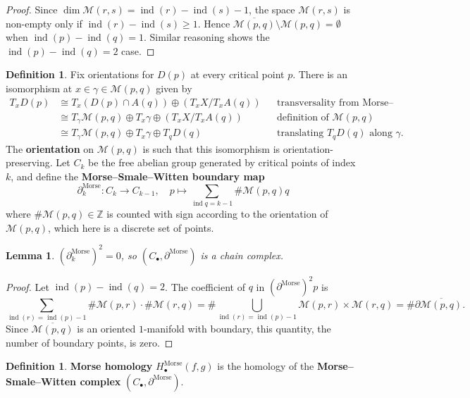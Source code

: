 \documentclass{report}
\theoremstyle{plain}
\newtheorem{lemma}[theorem]{Lemma}
\theoremstyle{definition}
\newtheorem{definition}[theorem]{Definition}
\theoremstyle{remark}
\newcommand{\di}{\partial}
\newcommand{\bZ}{\mathbb{Z}}
\newcommand{\cM}{\mathcal{M}}
\newcommand{\Morse}{\mathrm{Morse}}
\DeclareMathOperator{\ind}{ind}
\begin{document}
\begin{proof}
  Since $\dim \cM(r, s) = \ind(r) - \ind(s) - 1$, the space $\cM(r,
  s)$ is non-empty only if $\ind(r) - \ind(s) \ge 1$. Hence
  $\overline{\cM(p, q)}\setminus \cM(p, q) = \emptyset$ when $\ind(p)
  - \ind(q) = 1$. Similar reasoning shows the $\ind(p) - \ind(q) = 2$
  case.
\end{proof}

\begin{definition} \label{def:morse-theory-flow-line-orientation}
  Fix orientations for $D(p)$ at every critical point $p$. There is an
  isomorphism at $x \in \gamma \in \cM(p, q)$ given by
  \begin{align*}
    T_xD(p) &\cong T_x(D(p) \cap A(q)) \oplus (T_xX/T_xA(q)) && \text{transversality from Morse--Smale} \\
    &\cong T_\gamma \cM(p, q) \oplus T_x\gamma \oplus (T_xX/T_xA(q)) && \text{definition of $\cM(p, q)$} \\
    &\cong T_\gamma \cM(p, q) \oplus T_x\gamma \oplus T_qD(q) && \text{translating $T_qD(q)$ along $\gamma$.}
  \end{align*}
  The {\bf orientation} on $\cM(p, q)$ is such that this isomorphism
  is orientation-preserving. Let $C_k$ be the free abelian group
  generated by critical points of index $k$, and define the {\bf
    Morse--Smale--Witten boundary map}
  \[ \di_k^{\Morse}\colon C_k \to C_{k-1}, \quad p \mapsto \sum_{\ind q = k-1} \# \cM(p, q) q \]
  where $\# \cM(p, q) \in \bZ$ is counted with sign according to the
  orientation of $\cM(p, q)$, which here is a discrete set of points.
\end{definition}

\begin{lemma}
  $(\di_k^\Morse)^2 = 0$, so $(C_\bullet, \di^\Morse)$ is a chain
  complex.
\end{lemma}

\begin{proof}
  Let $\ind(p) - \ind(q) = 2$. The coefficient of $q$ in
  $(\di^\Morse)^2p$ is
  \[ \sum_{\ind(r) = \ind(p)-1} \# \cM(p, r) \cdot \# \cM(r, q) = \# \bigcup_{\ind(r) = \ind(p)-1} \cM(p, r) \times \cM(r, q) = \# \di \overline{\cM(p, q)}. \]
  Since $\overline{\cM(p, q)}$ is an oriented $1$-manifold with
  boundary, this quantity, the number of boundary points, is
  zero.
\end{proof}

\begin{definition}
  {\bf Morse homology} $H_\bullet^\Morse(f, g)$ is the homology of the
  {\bf Morse--Smale--Witten complex} $(C_\bullet, \di^{\Morse})$.
\end{definition}
\end{document}

